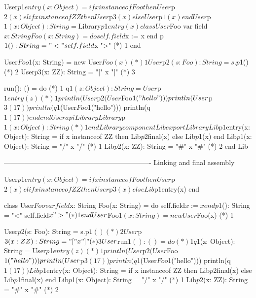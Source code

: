 {User$p$1$entry(x: Object) =
  if x instanceof Foo then User$p$2(x)
  elif x instanceof ZZ then User$p$3(x)
  else User$p$1(x) end

User$p$1(x: Object): String = $Library$p$1$entry(x)

class User$Foo
  var field$x: String
  Foo(x: String) = do self.field$x := x end
  p$1(): String = "<" self.field$x ">" (*) 1
end

User$Foo$1(x: String) = new User$Foo(x) (*) 1

User$p$2(s: Foo): String = s.p$1() (*) 2
User$p$3(x: ZZ): String = "[" x "]" (*) 3

run(): () = do    (*) 1
  q$1(z: Object): String = User$p$1entry(z) (*) 1
  println(User$p$2(User$Foo$1("hello")))
  println(User$p$3(17))
  println(q$1(User$Foo$1("hello")))
  println(q$1(17))
end
end User

api Library
Library$p$1(x: Object): String  (*) 1
end Library

component Lib
export Library
Lib$p$1$entry(x: Object): String =
  if x instanceof ZZ then Lib$p$2final(x)
  else Lib$p$1(x) end
Lib$p$1(x: Object): String = "/" x "/"  (*) 1
Lib$p$2(x: ZZ): String = "#" x "#"   (*) 2
end Lib

----------------------------------------------------------------
Linking and final assembly

User$p$1$entry(x: Object) =
  if x instanceof Foo then User$p$2(x)
  elif x instanceof ZZ then User$p$3(x)
  else Lib$p$1$entry(x) end

class User$Foo
  var field$x: String
  Foo(x: String) = do self.field$x := x end
  p$1(): String = "<" self.field$x ">" (*) 1
end

User$Foo$1(x: String) = new User$Foo(x) (*) 1

User$p$2(s: Foo): String = s.p$1() (*) 2
User$p$3(x: ZZ): String = "[" x "]" (*) 3

User$run$1(): () = do    (*) 1
  q$1(z: Object): String = User$p$1$entry(z) (*) 1
  println(User$p$2(User$Foo$1("hello")))
  println(User$p$3(17))
  println(q$1(User$Foo$1("hello")))
  println(q$1(17))

Lib$p$1$entry(x: Object): String =
  if x instanceof ZZ then Lib$p$2final(x)
  else Lib$p$1final(x) end
Lib$p$1(x: Object): String = "/" x "/"  (*) 1
Lib$p$2(x: ZZ): String = "#" x "#"   (*) 2



}
